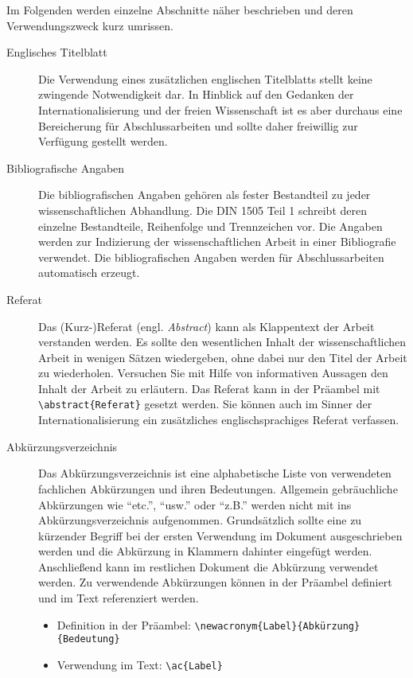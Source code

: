 \documentclass[
%
	thesis=paper,		%
	compactlistof,		%
	noauthorship,		%
%
	fancy,				%
%
%
]{hsmw-thesis}
\begin{document}
	Im Folgenden werden einzelne Abschnitte näher beschrieben und deren Verwendungszweck kurz umrissen.
	
	\begin{description}
		\item[Englisches Titelblatt]\label{itm:englishTitle}
		Die Verwendung eines zusätzlichen englischen Titelblatts stellt keine zwingende Notwendigkeit dar.
		In Hinblick auf den Gedanken der Internationalisierung und der freien Wissenschaft ist es aber durchaus eine Bereicherung für Abschlussarbeiten und sollte daher freiwillig zur Verfügung gestellt werden.
		
		\item[Bibliografische Angaben]\label{itm:bibliographicData}
		Die bibliografischen Angaben gehören als fester Bestandteil zu jeder wissenschaftlichen Abhandlung.
		Die DIN 1505 Teil 1 schreibt deren einzelne Bestandteile, Reihenfolge und Trennzeichen vor.
		Die Angaben werden zur Indizierung der wissenschaftlichen Arbeit in einer Bibliografie verwendet.
		Die bibliografischen Angaben werden für Abschlussarbeiten automatisch erzeugt.
		
		\item[Referat]\label{itm:abstract}
		Das (Kurz-)Referat (engl. \textit{Abstract}) kann als Klappentext der Arbeit verstanden werden.
		Es sollte den wesentlichen Inhalt der wissenschaftlichen Arbeit in wenigen Sätzen wiedergeben, ohne dabei nur den Titel der Arbeit zu wiederholen.
		Versuchen Sie mit Hilfe von informativen Aussagen den Inhalt der Arbeit zu erläutern.
		Das Referat kann in der Präambel mit \verb|\abstract{Referat}| gesetzt werden.
		Sie können auch im Sinner der Internationalisierung ein zusätzliches englischsprachiges Referat verfassen.
		
		\item[Abkürzungsverzeichnis]\label{itm:acronyms}
		Das Abkürzungsverzeichnis ist eine alphabetische Liste von verwendeten fachlichen Abkürzungen und ihren Bedeutungen.
		Allgemein gebräuchliche Abkürzungen wie \enquote{etc.}, \enquote{usw.} oder \enquote{z.B.} werden nicht mit ins Abkürzungsverzeichnis aufgenommen.
		Grundsätzlich sollte eine zu kürzender Begriff bei der ersten Verwendung im Dokument ausgeschrieben werden und die Abkürzung in Klammern dahinter eingefügt werden.
		Anschließend kann im restlichen Dokument die Abkürzung verwendet werden.
		Zu verwendende Abkürzungen können in der Präambel definiert und im Text referenziert werden.
		\begin{itemize}
			\item Definition in der Präambel: \verb|\newacronym{Label}{Abkürzung}{Bedeutung}|
			\item Verwendung im Text: \verb|\ac{Label}|
		\end{itemize}
		

\end{description}
\end{document}
